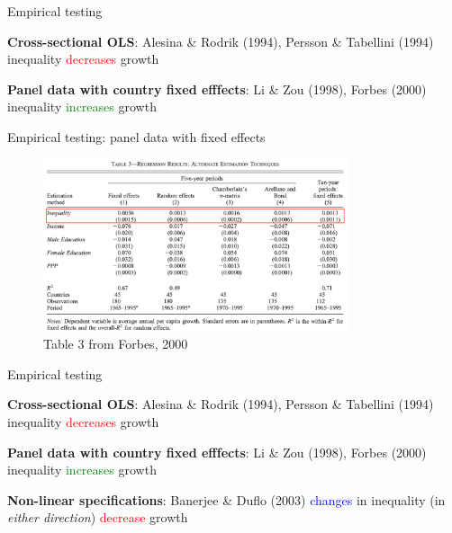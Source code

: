 \documentclass[aspectratio=169]{beamer}
\begin{document}
\begin{frame}{Empirical testing}

\begin{outline}
\1 \textbf{Cross-sectional OLS}: Alesina \& Rodrik (1994), Persson 
\& Tabellini (1994)
\2 inequality \textcolor{red}{decreases} growth

\vspace{2em} 

\1 \textbf{Panel data with country fixed efffects}: Li 
\& Zou (1998), Forbes (2000)
\2 inequality \textcolor{green}{increases} growth

\vspace{2em} 


\end{outline}

\end{frame}
\begin{frame}{Empirical testing: panel data with fixed effects}

\begin{figure}
\includegraphics[width=0.8\textwidth]{forbes.png}
\caption*{\footnotesize{Table 3 from Forbes, 2000} }
\end{figure}

\end{frame} 
\begin{frame}{Empirical testing}

\begin{outline}
\1 \textbf{Cross-sectional OLS}: Alesina \& Rodrik (1994), Persson 
\& Tabellini (1994)
\2 inequality \textcolor{red}{decreases} growth

\vspace{2em} 

\1 \textbf{Panel data with country fixed efffects}: Li 
\& Zou (1998), Forbes (2000)
\2 inequality \textcolor{green}{increases} growth

\vspace{2em} 


\1 \textbf{Non-linear specifications}: Banerjee \& Duflo (2003)
\2 \textcolor{blue}{changes} in inequality (in \textit{either direction}) \textcolor{red}{decrease} growth 

\end{outline}

\end{frame}
\end{document}
